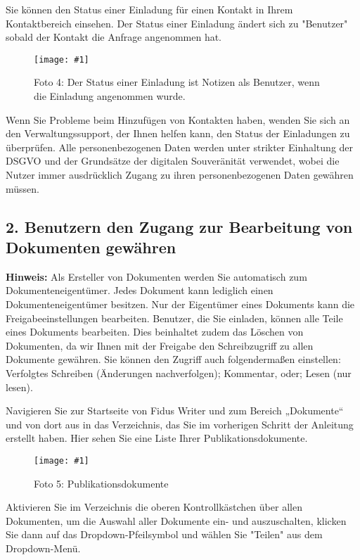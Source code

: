 \documentclass{article}
\newlength{\imgwidth}
\newcommand\scaledgraphics[2]{%
                
\settowidth{\imgwidth}{\texttt{[image: \#1]}}%
                
\setlength{\imgwidth}{\minof{\imgwidth}{#2\textwidth}}%
                
\texttt{[image: \#1]}%
                
}
\begin{document}
Sie können den Status einer Einladung für einen Kontakt in Ihrem Kontaktbereich einsehen. Der Status einer Einladung ändert sich zu "Benutzer" sobald der Kontakt die Anfrage angenommen hat.

\begin{figure}
\scaledgraphics{bea36502-ae28-444b-a70f-7fd8917ed085.png}{1}
\caption*{Foto 4: Der Status einer Einladung ist Notizen als Benutzer, wenn die Einladung angenommen wurde.}\label{F51031911}
\end{figure}


Wenn Sie Probleme beim Hinzufügen von Kontakten haben, wenden Sie sich an den Verwaltungssupport, der Ihnen helfen kann, den Status der Einladungen zu überprüfen. Alle personenbezogenen Daten werden unter strikter Einhaltung der DSGVO und der Grundsätze der digitalen Souveränität verwendet, wobei die Nutzer immer ausdrücklich Zugang zu ihren personenbezogenen Daten gewähren müssen.


\subsection{2. Benutzern den Zugang zur Bearbeitung von Dokumenten gewähren}\label{H2959514}



\textbf{Hinweis:} Als Ersteller von Dokumenten werden Sie automatisch zum Dokumenteneigentümer. Jedes Dokument kann lediglich einen Dokumenteneigentümer besitzen. Nur der Eigentümer eines Dokuments kann die Freigabeeinstellungen bearbeiten. Benutzer, die Sie einladen, können alle Teile eines Dokuments bearbeiten. Dies beinhaltet zudem das Löschen von Dokumenten, da wir Ihnen mit der Freigabe den Schreibzugriff zu allen Dokumente gewähren. Sie können den Zugriff auch folgendermaßen einstellen: Verfolgtes Schreiben (Änderungen nachverfolgen); Kommentar, oder; Lesen (nur lesen).


Navigieren Sie zur Startseite von Fidus Writer und zum Bereich „Dokumente“ und von dort aus in das Verzeichnis, das Sie im vorherigen Schritt der Anleitung erstellt haben. Hier sehen Sie eine Liste Ihrer Publikationsdokumente.

\begin{figure}
\scaledgraphics{257455fd-bc94-461a-a77e-7b0bc27dc03d.png}{1}
\caption*{Foto 5: Publikationsdokumente}\label{F62151421}
\end{figure}


Aktivieren Sie im Verzeichnis die oberen Kontrollkästchen über allen Dokumenten, um die Auswahl aller Dokumente ein- und auszuschalten, klicken Sie dann auf das Dropdown-Pfeilsymbol und wählen Sie "Teilen" aus dem Dropdown-Menü.
\end{document}
